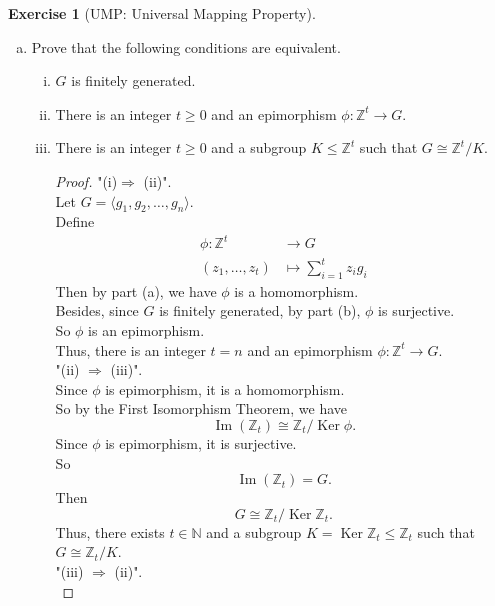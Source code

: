 \documentclass{article}
\newcommand{\bbz}{\mathbb{Z}}
\newcommand{\bbn}{\mathbb{N}}
\renewcommand{\ker}{\operatorname{Ker}}
\newcommand{\im}{\operatorname{Im}}
\theoremstyle{plain}
\theoremstyle{definition}
\newtheorem{exer}[lem]{Exercise}
\begin{document}
\begin{exer}[UMP: Universal Mapping Property]
\begin{enumerate}[(a)]
\begin{proof}
	\[g = \phi (f) = \sum_{i=1}^tg_i{f_i} \in \langle g_1,g_2,\ldots,g_t\rangle,\]
	which is contradicted by the other assumption that $g \not\in \langle g_1,g_2,\ldots,g_t\rangle$.\\
	Thus, if $g \in G$, then $g \in \langle g_1,g_2,\ldots,g_t\rangle$.\\
	Namely, $G \subset \langle g_1,g_2,\ldots,g_t\rangle = \im(\phi) = G$.\\
	Therefore,
	\[G = \langle g_1,g_2,\ldots,g_t\rangle.\]
	In summary, $\phi$ is surjective if and only if $G=\langle g_1,\ldots,g_t\rangle$.
\end{proof}


\item 
Prove that the following conditions are equivalent.
\begin{enumerate}[(i)]
\item $G$ is finitely generated.
\item 
There is an integer $t\geq 0$ and an epimorphism $\phi\colon\bbz^t\to G$.
\item There is an integer $t\geq 0$ and a subgroup $K\leq\bbz^t$ such that $G\cong\bbz^t/K$.
\begin{proof}
  "(i)$\Rightarrow$ (ii)".\\
  Let $G = \langle g_1,g_2,\ldots,g_n\rangle$.\\
  Define 
  \begin{align*}
	\phi: \bbz^t &\to G \\
  	(z_1,\ldots,z_t) &\mapsto \sum_{i=1}^tz_ig_i 
  \end{align*}
  Then by part (a), we have $\phi$ is a homomorphism.\\
  Besides, since $G$ is finitely generated, by part (b), $\phi$ is surjective.\\
  So $\phi$ is an epimorphism.\\
  Thus, there is an integer $t= n$ and an epimorphism $\phi:\bbz^t \to G$.\\
  "(ii) $\Rightarrow$ (iii)".\\
  	Since $\phi$ is epimorphism, it is a homomorphism. \\
	So by the First Isomorphism Theorem, we have
	\[\im(\bbz_t) \cong \bbz_t/\ker{\phi}.\]
	Since $\phi$ is epimorphism, it is surjective.\\
	So 
	\[\im(\bbz_t) = G.\]
	Then
	\[G \cong \bbz_t/\ker{\bbz_t}.\]
  	Thus, there exists $t \in \bbn$ and a subgroup $K = \ker{\bbz_t} \leq \bbz_t$ such that $G \cong \bbz_t/K$.\\
  	"(iii) $\Rightarrow$ (ii)".\\

\end{proof}
\end{enumerate}
\end{enumerate}
\end{exer}
\end{document}
